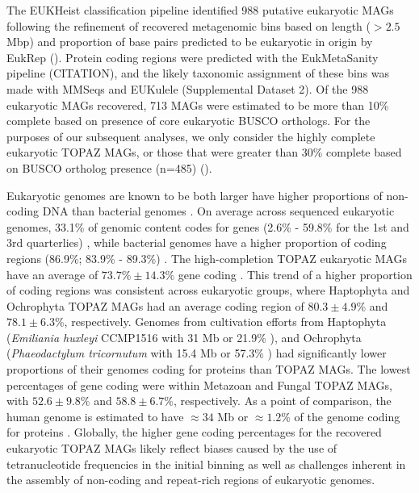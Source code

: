 \documentclass[12pt]{article}
\numberwithin{equation}{section}
\begin{document}
The EUKHeist classification pipeline identified 988 putative eukaryotic MAGs following the refinement of recovered metagenomic bins based on length ($>2.5$ Mbp) and proportion of base pairs predicted to be eukaryotic in origin by EukRep (). Protein coding regions were predicted with the EukMetaSanity pipeline (CITATION), and the likely taxonomic assignment of these bins was made with MMSeqs  \citep{Steinegger2018} and EUKulele \citep{Krinos2021EUKulele} (Supplemental Dataset 2). Of the 988 eukaryotic MAGs recovered, 713 MAGs were estimated to be more than 10\% complete based on presence of core eukaryotic BUSCO orthologs. For the purposes of our subsequent analyses, we only consider the highly complete eukaryotic TOPAZ MAGs, or those that were greater than 30\% complete based on BUSCO ortholog presence (n=485) (). 

Eukaryotic genomes are known to be both larger have higher proportions of non-coding DNA than bacterial genomes \citep{Zhang2011practical}. 
On average across sequenced eukaryotic genomes, 33.1\% of genomic content codes for genes (2.6\% - 59.8\% for the 1st and 3rd quarterlies) \citep{Hou_2009}, while bacterial genomes have a higher proportion of coding regions (86.9\%; 83.9\% - 89.3\%) \citep{Hou_2009}. The high-completion TOPAZ eukaryotic MAGs have an average of $73.7\% \pm 14.3\%$ gene coding . This trend of a higher proportion of coding regions was consistent across eukaryotic groups, where Haptophyta and Ochrophyta TOPAZ MAGs had an average coding region of $80.3 \pm 4.9\%$  and $78.1 \pm 6.3\%$, respectively. Genomes from cultivation efforts from Haptophyta (\textit{Emiliania huxleyi} CCMP1516 with 31 Mb or 21.9\% \citep{Read2013}), and Ochrophyta (\textit{Phaeodactylum tricornutum} with 15.4 Mb or 57.3\% \citep{Bowler_2008}) had significantly lower proportions of their genomes coding for proteins than TOPAZ MAGs. The lowest percentages of gene coding were within Metazoan and Fungal TOPAZ MAGs, with $52.6\pm 9.8\%$ and  $58.8 \pm 6.7\%$, respectively. As a point of comparison, the human genome is estimated to have $\approx 34$ Mb or $\approx 1.2$\% of the  genome coding for proteins \citep{humangenome}. Globally, the higher gene coding percentages for the recovered eukaryotic TOPAZ MAGs likely reflect biases caused by the use of tetranucleotide frequencies in the initial binning \citep{Kang_2019} as well as challenges inherent in the assembly of non-coding and repeat-rich regions of eukaryotic genomes. 
\end{document}
